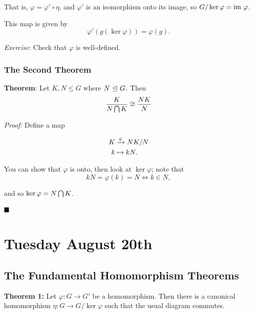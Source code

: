 \begin{center}
\end{center}

That is, \(\varphi = \varphi' \circ \eta\), and \(\varphi'\) is an
isomorphism onto its image, so \(G/\ker \varphi = {\text{im}~} \varphi\).

This map is given by \[
\varphi'(g(\ker \varphi)) = \varphi(g)
.\]

\emph{Exercise}: Check that \(\varphi\) is well-defined.

\hypertarget{the-second-theorem}{%
\subsubsection{The Second Theorem}\label{the-second-theorem}}

\textbf{Theorem}: Let \(K, N \leq G\) where \(N {~\trianglelefteq~} G\). Then \[
\frac K {N \bigcap K} \cong \frac {NK} N
\]

\emph{Proof:} Define a map

\begin{align*}
K &\xrightarrow{\varphi} NK/N \\
k &\mapsto kN
.\end{align*}

You can show that \(\varphi\) is onto, then look at \(\ker \varphi\);
note that \[
kN = \varphi(k) = N \iff k \in N
,\]

and so \(\ker \varphi = N \bigcap K\).

\(\qed\)

\hypertarget{tuesday-august-20th}{%
\section{Tuesday August 20th}\label{tuesday-august-20th}}

\hypertarget{the-fundamental-homomorphism-theorems}{%
\subsection{The Fundamental Homomorphism
Theorems}\label{the-fundamental-homomorphism-theorems}}

\textbf{Theorem 1:} Let \(\varphi: G \to G'\) be a homomorphism. Then
there is a canonical homomorphism \(\eta: G \to G/\ker \varphi\) such
that the usual diagram commutes.

